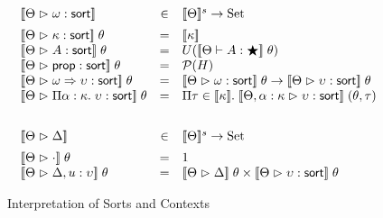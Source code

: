 \begin{figure}
\begin{displaymath}
  \begin{array}{lcl}
    \interp{\judgeSort{\omega}} & \in & \interpset{\Theta} \to \mathrm{Set} \\[0.5em]
    \interp{\judgeSort{\kappa}} \;\theta
    & = & \interp{\kappa} 
    \\
    \interp{\judgeSort{A}}\;\theta
    & = & U(\interp{\judgeWK{A}{\bigstar}}\;\theta)
    \\
    \interp{\judgeSort{\assert}}\;\theta
    & = & \powerset{H}
    \\
    \interp{\judgeSort{\omega \To \upsilon}}\;\theta
    & = & \interp{\judgeSort{\omega}}\;\theta \to \interp{\judgeSort{\upsilon}}\;\theta
    \\
    \interp{\judgeSort{\forallsort{\alpha}{\kappa}{\upsilon}}}\;\theta
    & = & \Pi \tau \in \interp{\kappa}.\;\interp{\judgeSort[\Theta, \alpha:\kappa]{\upsilon}}\;(\theta,\tau)
    \\[2em]
    \interp{\judgeACtx{\Delta}} & \in & \interpset{\Theta} \to \mathrm{Set} \\[0.5em]
    \interp{\judgeACtx{\cdot}}\;\theta & = & 1 \\
    \interp{\judgeACtx{\Delta, u:\upsilon}}\;\theta & = & \interp{\judgeACtx{\Delta}}\;\theta \times
                                                          \interp{\judgeSort{\upsilon}}\;\theta

  \end{array}
\end{displaymath}
\caption{Interpretation of Sorts and Contexts}
\label{sort-interpretation}  
\end{figure}



